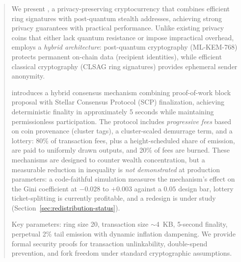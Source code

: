 %
%






\maketitle

\begin{abstract}
\noindent
We present \Botho, a privacy-preserving cryptocurrency that combines
efficient ring signatures with post-quantum stealth addresses, achieving
strong privacy guarantees with practical performance. Unlike existing
privacy coins that either lack quantum resistance or impose impractical
overhead, \Botho employs a \emph{hybrid architecture}: post-quantum
cryptography (ML-KEM-768) protects permanent on-chain data (recipient
identities), while efficient classical cryptography (CLSAG ring signatures)
provides ephemeral sender anonymity.

\Botho introduces a hybrid consensus mechanism combining proof-of-work
block proposal with Stellar Consensus Protocol (SCP) finalization,
achieving deterministic finality in approximately 5 seconds while
maintaining permissionless participation. The protocol includes
\emph{progressive fees} based on coin provenance (cluster tags), a
cluster-scaled demurrage term, and a lottery: 80\% of transaction fees,
plus a height-scheduled share of emission, are paid to uniformly drawn
outputs, and 20\% of fees are burned. These mechanisms are designed to
counter wealth concentration, but a measurable reduction in inequality is
\emph{not demonstrated} at production parameters: a code-faithful
simulation measures the mechanism's effect on the Gini coefficient at
$-0.028$ to $+0.003$ against a $0.05$ design bar, lottery ticket-splitting
is currently profitable, and a redesign is under study
(Section~\ref{sec:redistribution-status}).

Key parameters: ring size 20, transaction size $\sim$4~KB, 5-second
finality, perpetual 2\% tail emission with dynamic inflation dampening.
We provide formal security proofs for transaction unlinkability,
double-spend prevention, and fork freedom under standard cryptographic
assumptions.
\end{abstract}

